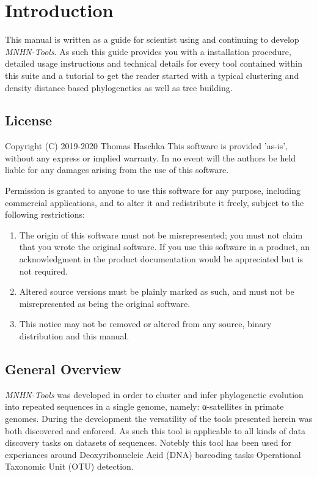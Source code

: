 \chapter{Introduction}

This manual is written as a guide for scientist using and continuing to
develop \emph{MNHN-Tools}. As such this guide provides you with a
installation procedure, detailed usage instructions and technical
details for every tool contained within this suite and a tutorial to get
the reader started with a typical clustering and density distance
based phylogenetics as well as tree building.

\section{License}
Copyright (C) 2019-2020 Thomas Haschka \newline
This software is provided 'as-is', without any express or implied
warranty.  In no event will the authors be held liable for any damages
arising from the use of this software.

Permission is granted to anyone to use this software for any purpose,
including commercial applications, and to alter it and redistribute it
freely, subject to the following restrictions:

\begin{enumerate}
  \item The origin of this software must not be misrepresented; you must not
    claim that you wrote the original software. If you use this software
   in a product, an acknowledgment in the product documentation would be
   appreciated but is not required.
  \item Altered source versions must be plainly marked as such, and must not be
    misrepresented as being the original software.
  \item This notice may not be removed or altered from any source,
    binary distribution and this manual.
\end{enumerate}

\section{General Overview}

\emph{MNHN-Tools} was developed in order to cluster and infer
phylogenetic evolution into repeated sequences in a single genome,
namely: α-satellites in primate genomes. During the development
the versatility of the tools presented herein was both discovered and
enforced. As such this tool is applicable to all kinds of data
discovery tasks on datasets of sequences. Notebly this tool has been
used for experiances around Deoxyribonucleic Acid (DNA) barcoding tasks
Operational Taxonomic Unit (OTU) detection.

